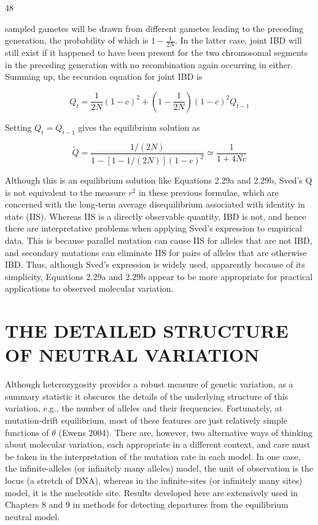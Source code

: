 \documentclass{article}
\begin{document}
48

sampled gametes will be drawn from different gametes leading to the preceding generation, the probability of which is  $ 1 - \frac{1}{2N} $. In the latter case, joint IBD will still exist if it happened to have been present for the two chromosomal segments in the preceding generation with no recombination again occurring in either. Summing up, the recursion equation for joint IBD is

\begin{equation}
Q_{t}=\frac{1}{2N}(1-c)^{2}+\left(1-\frac{1}{2N}\right)(1-c)^{2}Q_{t-1}
\end{equation}

Setting  $ Q_{t} = Q_{t-1} $ gives the equilibrium solution as

\begin{equation}
\tilde{Q}=\frac{1/(2N)}{1-[1-1/(2N)](1-c)^{2}}\simeq\frac{1}{1+4N c}
\end{equation}

Although this is an equilibrium solution like Equations 2.29a and 2.29b, Sved's Q is not equivalent to the measure  $ r^{2} $ in these previous formulae, which are concerned with the long-term average disequilibrium associated with identity in state (IIS). Whereas IIS is a directly observable quantity, IBD is not, and hence there are interpretative problems when applying Sved's expression to empirical data. This is because parallel mutation can cause IIS for alleles that are not IBD, and secondary mutations can eliminate IIS for pairs of alleles that are otherwise IBD. Thus, although Sved's expression is widely used, apparently because of its simplicity, Equations 2.29a and 2.29b appear to be more appropriate for practical applications to observed molecular variation.

\section{THE DETAILED STRUCTURE OF NEUTRAL VARIATION}
Although heterozygosity provides a robust measure of genetic variation, as a summary statistic it obscures the details of the underlying structure of this variation, e.g., the number of alleles and their frequencies. Fortunately, at mutation-drift equilibrium, most of these features are just relatively simple functions of  $ \theta $ (Ewens 2004). There are, however, two alternative ways of thinking about molecular variation, each appropriate in a different context, and care must be taken in the interpretation of the mutation rate in each model. In one case, the infinite-alleles (or infinitely many alleles) model, the unit of observation is the locus (a stretch of DNA), whereas in the infinite-sites (or infinitely many sites) model, it is the nucleotide site. Results developed here are extensively used in Chapters 8 and 9 in methods for detecting departures from the equilibrium neutral model.
\end{document}
